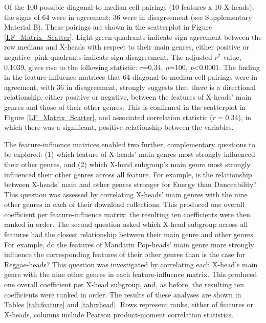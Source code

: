 \documentclass[a4paper]{article}
\begin{document}
Of the 100 possible diagonal-to-median cell pairings (10 features x 10 X-heads), the signs of 64 were in agreement; 36 were in disagreement (see Supplementary Material B). These pairings are shown in the scatterplot in Figure \ref{LF_Matrix_Scatter}. Light-green quadrants indicate sign agreement between the row medians and X-heads with respect to their main genres, either positive or negative; pink quadrants indicate sign disagreement. The adjusted $r^{2}$ value, 0.1039, gives rise to the following statistic: \textit{r}=0.34, \textit{n}=100, \textit{p}<0.0001. The finding in the feature-influence matrices that 64 diagonal-to-median cell pairings were in agreement, with 36 in disagreement, strongly suggests that there is a directional relationship, either positive or negative, between the features of X-heads’ main genres and those of their other genres. This is confirmed in the scatterplot in Figure \ref{LF_Matrix_Scatter}, and associated correlation statistic ($r=0.34$), in which there was a significant, positive relationship between the variables. 

The feature-influence matrices enabled two further, complementary questions to be explored: (1) which feature of X-heads’ main genres most strongly influenced their other genres, and (2) which X-head subgroup’s main genre most strongly influenced their other genres across all feature. For example, is the relationship between X-heads’ main and other genres stronger for Energy than Danceability? This question was assessed by correlating X-heads’ main genres with the nine other genres in each of their download collections. This produced one overall coefficient per feature-influence matrix; the resulting ten coefficients were then ranked in order. The second question asked which X-head subgroup across all features had the closest relationship between their main genre and other genres. For example, do the features of Mandarin Pop-heads’ main genre more strongly influence the corresponding features of their other genres than is the case for Reggae-heads? This question was investigated by correlating each X-head’s main genre with the nine other genres in each feature-influence matrix. This produced one overall coefficient per X-head subgroup, and, as before, the resulting ten coefficients were ranked in order. The results of these analyses are shown in Tables \ref{tab:feature} and \ref{tab:xhead}. Rows represent ranks, either of features or X-heads, columns include Pearson product-moment correlation statistics. 
\end{document}
